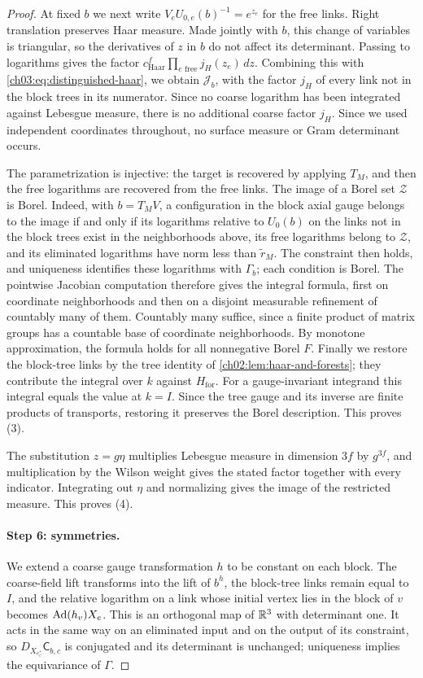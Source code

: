 \begin{proof}
At fixed $b$ we next write $V_eU_{0,e}(b)^{-1}=e^{z_e}$ for the free links. Right translation preserves Haar measure. Made jointly with $b$, this change of variables is triangular, so the derivatives of $z$ in $b$ do not affect its determinant. Passing to logarithms gives the factor $c_{\mathrm{Haar}}^f\prod_{e\text{ free}}j_H(z_e)\,dz$. Combining this with \eqref{ch03:eq:distinguished-haar}, we obtain $\mathscr J_b$, with the factor $j_H$ of every link not in the block trees in its numerator. Since no coarse logarithm has been integrated against Lebesgue measure, there is no additional coarse factor $j_H$. Since we used independent coordinates throughout, no surface measure or Gram determinant occurs.

The parametrization is injective: the target is recovered by applying $T_M$, and then the free logarithms are recovered from the free links. The image of a Borel set $\mathcal Z$ is Borel. Indeed, with $b=T_MV$, a configuration in the block axial gauge belongs to the image if and only if its logarithms relative to $U_0(b)$ on the links not in the block trees exist in the neighborhoods above, its free logarithms belong to $\mathcal Z$, and its eliminated logarithms have norm less than $\widetilde r_M$. The constraint then holds, and uniqueness identifies these logarithms with $\Gamma_b$; each condition is Borel. The pointwise Jacobian computation therefore gives the integral formula, first on coordinate neighborhoods and then on a disjoint measurable refinement of countably many of them. Countably many suffice, since a finite product of matrix groups has a countable base of coordinate neighborhoods. By monotone approximation, the formula holds for all nonnegative Borel $F$. Finally we restore the block-tree links by the tree identity of \cref{ch02:lem:haar-and-forests}; they contribute the integral over $k$ against $H_{\mathrm{for}}$. For a gauge-invariant integrand this integral equals the value at $k=I$. Since the tree gauge and its inverse are finite products of transports, restoring it preserves the Borel description. This proves (3).

The substitution $z=g\eta$ multiplies Lebesgue measure in dimension $3f$ by $g^{3f}$, and multiplication by the Wilson weight gives the stated factor together with every indicator. Integrating out $\eta$ and normalizing gives the image of the restricted measure. This proves (4).

\paragraph{Step 6: symmetries.}
We extend a coarse gauge transformation $h$ to be constant on each block. The coarse-field lift transforms into the lift of $b^h$, the block-tree links remain equal to $I$, and the relative logarithm on a link whose initial vertex lies in the block of $v$ becomes $\operatorname{Ad}(h_v)X_e$. This is an orthogonal map of $\mathbb R^3$ with determinant one. It acts in the same way on an eliminated input and on the output of its constraint, so $D_{X_{e^*_c}}\mathsf C_{b,c}$ is conjugated and its determinant is unchanged; uniqueness implies the equivariance of $\Gamma$.


\end{proof}
